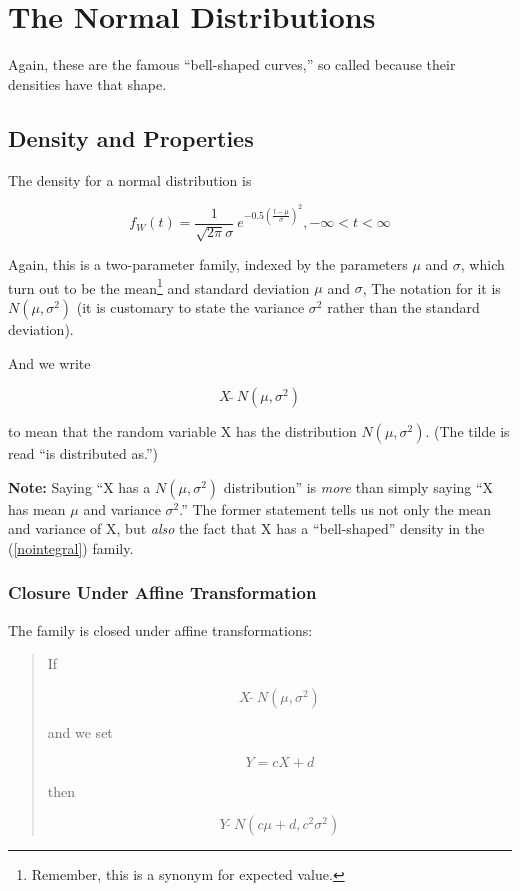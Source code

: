 \chapter{The Normal Distributions}
\label{chap:normal}

Again, these are the famous ``bell-shaped curves,'' so called because
their densities have that shape.

\section{Density and Properties}

The density for a normal distribution is

\begin{equation}
\label{nointegral}
f_W(t) = \frac{1}{\sqrt{2\pi} \sigma} ~ e^{- 0.5 \left (\frac{t-\mu}{\sigma}
\right )^2}, -\infty < t < \infty
\end{equation}

Again, this is a two-parameter family, indexed by the parameters $\mu$
and $\sigma$, which turn out to be the mean\footnote{Remember, this is a
synonym for expected value.} and standard deviation  $\mu$ and $\sigma$,
The notation for it is $N(\mu,\sigma^2)$ (it is customary to state
the variance $\sigma^2$ rather than the standard deviation).

And we write 

\begin{equation}
X ~ \widetilde{ } ~ N(\mu,\sigma^2)
\end{equation}

to mean that the random variable X has the distribution $N(\mu,\sigma^2)$.
(The tilde is read ``is distributed as.'')


{\bf Note:} Saying ``X has a $N(\mu,\sigma^2)$ distribution'' is {\it
more} than simply saying ``X has mean $\mu$ and variance $\sigma^2$.''
The former statement tells us not only the mean and variance of X, but
{\it also} the fact that X has a ``bell-shaped'' density in the
(\ref{nointegral}) family.

\subsection{Closure Under Affine Transformation}
\label{affine}

The family is closed under affine transformations:

\begin{quote}

If 

\begin{equation}
X ~ \widetilde{} ~ N(\mu,\sigma^2)
\end{equation}

and we set 

\begin{equation}
Y = cX + d 
\end{equation}

then

\begin{equation}
Y ~ \widetilde{} ~ N(c\mu+d,c^2\sigma^2)
\end{equation}

\end{quote}

